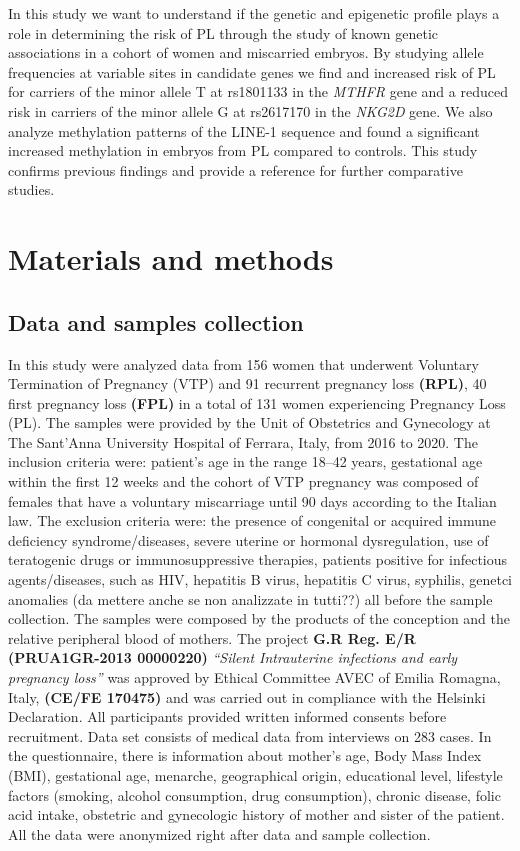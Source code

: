 \documentclass[10pt,letterpaper]{article}
\begin{document}
\noindent In this study we want to understand if the genetic and epigenetic profile plays a role in determining the risk of PL through the study of known genetic associations in a cohort of women and miscarried embryos. By studying allele frequencies at variable sites in candidate genes we find and increased risk of PL for carriers of the minor allele T at rs1801133 in the \textit{MTHFR} gene and a reduced risk in carriers of the minor allele G at rs2617170 in the \textit{NKG2D} gene. We also analyze methylation patterns of the LINE-1 sequence and found a significant increased methylation in embryos from PL compared to controls. This study confirms previous findings and provide a reference for further comparative studies. 




\section*{Materials and methods}
\subsection*{Data and samples collection}

In this study were analyzed data from 156 women that underwent Voluntary Termination of Pregnancy (VTP) and 91 recurrent pregnancy loss \textbf{(RPL)}, 40 first pregnancy loss \textbf{(FPL)} in a total of 131 women experiencing Pregnancy Loss (PL). The samples were provided by the Unit of Obstetrics and Gynecology at The Sant’Anna University Hospital of Ferrara, Italy, from 2016 to 2020. The inclusion criteria were: patient’s age in the range 18–42 years, gestational age within the first 12 weeks and the cohort of VTP pregnancy was composed of females that have a voluntary miscarriage until 90 days according to the Italian law. The exclusion criteria were: the presence of congenital or acquired immune deficiency syndrome/diseases, severe uterine or hormonal dysregulation, use of teratogenic drugs or immunosuppressive therapies, patients positive for infectious agents/diseases, such as HIV, hepatitis B virus, hepatitis C virus, syphilis, genetci anomalies (da mettere anche se non analizzate in tutti??) all before the sample collection. The samples were composed by the products of the conception and the relative peripheral blood of mothers. The project \textbf{G.R Reg. E/R (PRUA1GR-2013 00000220)} \textit{“Silent Intrauterine infections and early pregnancy loss”} was approved by Ethical Committee AVEC of Emilia Romagna, Italy, \textbf{(CE/FE 170475)} and was carried out in compliance with the Helsinki Declaration. All participants provided written informed consents before recruitment. Data set consists of medical data from interviews on 283 cases. In the questionnaire, there is information about mother’s age, Body Mass Index (BMI), gestational age, menarche, geographical origin, educational level, lifestyle factors (smoking, alcohol consumption, drug consumption), chronic disease, folic acid intake, obstetric and gynecologic history of mother and sister of the patient. All the data were anonymized right after data and sample collection. 
\end{document}
